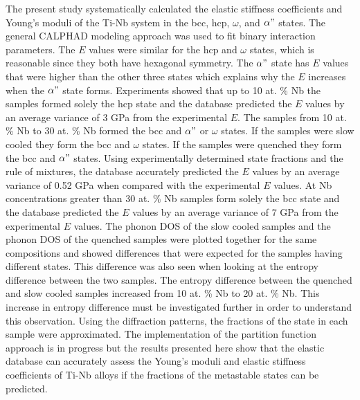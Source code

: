 The present study systematically calculated the elastic stiffness coefficients and Young's moduli of the Ti-Nb system in the bcc, hcp, $\omega$, and $\alpha"$ states. The general CALPHAD modeling approach was used to fit binary interaction parameters. The $E$ values were similar for the hcp and $\omega$ states, which is reasonable since they both have hexagonal symmetry. The $\alpha"$ state has $E$ values that were higher than the other three states which explains why the $E$ increases when the $\alpha"$ state forms. Experiments showed that up to 10 at. \% Nb the samples formed solely the hcp state and the database predicted the $E$ values by an average variance of 3 GPa from the experimental $E$. The samples from 10 at. \% Nb to 30 at. \% Nb formed the bcc and $\alpha"$ or $\omega$ states. If the samples were slow cooled they form the bcc and $\omega$ states. If the samples were quenched they form the bcc and $\alpha"$ states. Using experimentally determined state fractions and the rule of mixtures, the database accurately predicted the $E$ values by an average variance of 0.52 GPa when compared with the experimental $E$ values. At Nb concentrations greater than 30 at. \% Nb samples form solely the bcc state and the database predicted the $E$ values by an average variance of 7 GPa from the experimental $E$ values. The phonon DOS of the slow cooled samples and the phonon DOS of the quenched samples were plotted together for the same compositions and showed differences that were expected for the samples having different states. This difference was also seen when looking at the entropy difference between the two samples. The entropy difference between the quenched and slow cooled samples increased from 10 at. \% Nb to 20 at. \% Nb. This increase in entropy difference must be investigated further in order to understand this observation. Using the diffraction patterns, the fractions of the state in each sample were approximated. The implementation of the partition function approach is in progress but the results presented here show that the elastic database can accurately assess the Young's moduli and elastic stiffness coefficients of Ti-Nb alloys if the fractions of the metastable states can be predicted.

